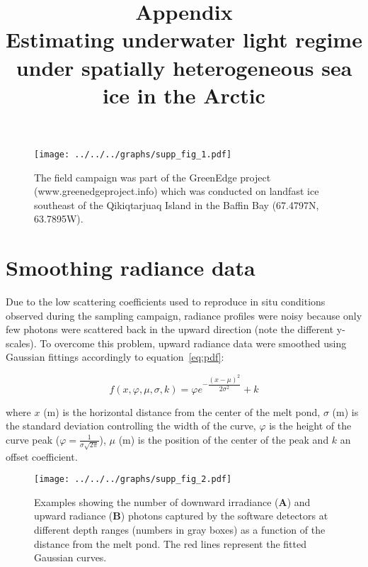 \documentclass[12pt,a4paper]{scrartcl}
\title{%
    Appendix \\
    \large  Estimating underwater light regime under spatially heterogeneous sea ice in the Arctic}
\date{}
\begin{document}
\maketitle

\tableofcontents
\listoffigures
\newpage

\begin{figure}[h]
	\centering
	\texttt{[image: ../../../graphs/supp\_fig\_1.pdf]}
	\caption{The field campaign was part of the GreenEdge project (www.greenedgeproject.info) which was conducted on landfast ice southeast of the Qikiqtarjuaq Island in the Baffin Bay (67.4797N, 63.7895W).}
\end{figure}

\clearpage
\newpage

\section{Smoothing radiance data}

Due to the low scattering coefficients used to reproduce in situ conditions observed during the sampling campaign, radiance profiles were noisy because only few photons were scattered back in the upward direction (note the different y-scales). To overcome this problem, upward radiance data were smoothed using Gaussian fittings accordingly to equation~\ref{eq:pdf}:

\begin{equation}
	\label{eq:pdf}
	f(x,\varphi,\mu,\sigma, k) = \varphi e^{-\dfrac{(x-\mu)^2}{2 \sigma^2}} + k
\end{equation}

\noindent where $x$ (m) is the horizontal distance from the center of the melt pond, $\sigma$ (m) is the standard deviation controlling the width of the curve, $\varphi$ is the height of the curve peak ($\varphi = \frac{1}{\sigma\sqrt{2\pi}}$), $\mu$ (m) is the position of the center of the peak and $k$ an offset coefficient.

\begin{figure}[h]
	\centering
	\texttt{[image: ../../../graphs/supp\_fig\_2.pdf]}
	\caption{Examples showing the number of downward irradiance (\textbf{A}) and upward radiance (\textbf{B}) photons captured by the software detectors at different depth ranges (numbers in gray boxes) as a function of the distance from the melt pond. The red lines represent the fitted Gaussian curves.}
\end{figure}

\clearpage
\newpage
\end{document}
